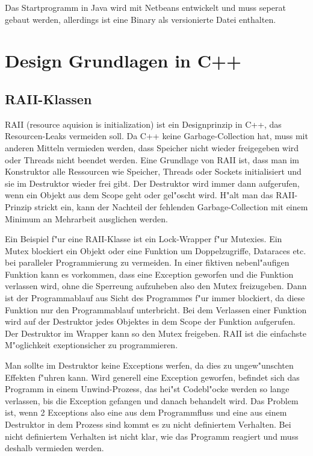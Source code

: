 \documentclass[14pt, a4paper]{report}
\begin{document}
Das Startprogramm in Java wird mit Netbeans entwickelt und muss seperat gebaut werden,
allerdings ist eine Binary als versionierte Datei enthalten.


\chapter{Design Grundlagen in C++}
\section{RAII-Klassen} \label{RAII}
RAII (resource aquision is initialization) ist ein Designprinzip in C++, das 
Resourcen-Leaks vermeiden soll. Da C++ keine Garbage-Collection hat, muss mit
anderen Mitteln vermieden werden, 
dass Speicher nicht wieder freigegeben wird oder Threads  nicht
beendet werden. Eine Grundlage von RAII ist, dass man im Konstruktor alle Ressourcen
wie Speicher, Threads oder Sockets initialisiert und sie im Destruktor wieder frei gibt.
Der Destruktor wird immer dann aufgerufen, wenn ein Objekt aus dem Scope geht oder
gel"oscht wird. H"alt man das RAII-Prinzip strickt ein, kann der Nachteil der fehlenden
Garbage-Collection mit einem Minimum an Mehrarbeit ausglichen werden. 

Ein Beispiel f"ur eine RAII-Klasse ist ein Lock-Wrapper f"ur Mutexies. Ein Mutex blockiert ein Objekt
oder eine Funktion um Doppelzugriffe, Dataraces etc. bei paralleler Programmierung
zu vermeiden. 
In einer fiktiven nebenl"aufigen Funktion kann es vorkommen, dass eine Exception geworfen und die
Funktion verlassen wird, ohne die Sperreung aufzuheben also den Mutex freizugeben. 
Dann ist der Programmablauf 
aus Sicht des Programmes f"ur immer blockiert, da diese Funktion nur den Programmablauf
unterbricht. Bei dem Verlassen einer Funktion wird auf der Destruktor jedes Objektes
in dem Scope der Funktion aufgerufen. Der Destruktor im Wrapper kann so den Mutex freigeben.
RAII ist die einfachste M"oglichkeit exeptionsicher zu programmieren. 

Man sollte im Destruktor keine Exceptions werfen, da dies zu ungew"unschten Effekten 
f"uhren kann. Wird generell eine Exception geworfen, befindet sich das Programm in einem
Unwind-Prozess, das hei"st Codebl"ocke werden so lange verlassen, bis die Exception
gefangen und danach behandelt wird. Das Problem ist, wenn 2 Exceptions also eine aus
dem Programmfluss und eine aus einem Destruktor in dem Prozess sind kommt es zu nicht
definiertem Verhalten. Bei nicht definiertem Verhalten ist nicht klar, wie das Programm 
reagiert und muss deshalb vermieden werden.
\newpage
\end{document}
